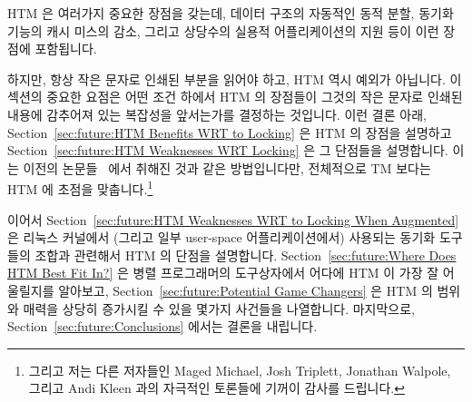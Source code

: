 HTM 은 여러가지 중요한 장점을 갖는데, 데이터 구조의 자동적인 동적 분할, 동기화
기능의 캐시 미스의 감소, 그리고 상당수의 실용적 어플리케이션의 지원 등이 이런
장점에 포함됩니다.

하지만, 항상 작은 문자로 인쇄된 부분을 읽어야 하고, HTM 역시 예외가 아닙니다.
이 섹션의 중요한 요점은 어떤 조건 하에서 HTM 의 장점들이 그것의 작은 문자로
인쇄된 내용에 감추어져 있는 복잡성을 앞서는가를 결정하는 것입니다.
이런 결론 아래,
Section~\ref{sec:future:HTM Benefits WRT to Locking}
은 HTM 의 장점을 설명하고
Section~\ref{sec:future:HTM Weaknesses WRT Locking}
은 그 단점들을 설명합니다.
이는 이전의 논문들~\cite{McKenney2007PLOSTM,PaulEMcKenney2010OSRGrassGreener}
에서 취해진 것과 같은 방법입니다만, 전체적으로 TM 보다는 HTM 에 초점을
맞춥니다.\footnote{
	그리고 저는 다른 저자들인 Maged Michael, Josh Triplett, Jonathan
	Walpole, 그리고 Andi Kleen  과의 자극적인 토론들에 기꺼이 감사를
	드립니다.}
\iffalse

HTM has a number of important benefits, including automatic
dynamic partitioning of data structures, reducing synchronization-primitive
cache misses, and supporting a fair number of practical applications.

However, it always pays to read the fine print, and HTM is no exception.
A major point of this section is determining under what conditions HTM's
benefits outweigh the complications hidden in its fine print.
To this end, Section~\ref{sec:future:HTM Benefits WRT to Locking}
describes HTM's benefits and
Section~\ref{sec:future:HTM Weaknesses WRT Locking} describes its weaknesses.
This is the same approach used in earlier
papers~\cite{McKenney2007PLOSTM,PaulEMcKenney2010OSRGrassGreener},
but focused on HTM rather than TM as a whole.\footnote{
	And I gratefully acknowledge many stimulating
	discussions with the other authors, Maged Michael, Josh Triplett,
	and Jonathan Walpole, as well as with Andi Kleen.}
\fi

이어서
Section~\ref{sec:future:HTM Weaknesses WRT to Locking When Augmented}
은 리눅스 커널에서 (그리고 일부 user-space 어플리케이션에서) 사용되는 동기화
도구들의 조합과 관련해서 HTM 의 단점을 설명합니다.
Section~\ref{sec:future:Where Does HTM Best Fit In?}
은 병렬 프로그래머의 도구상자에서 어다에 HTM 이 가장 잘 어울릴지를 알아보고,
Section~\ref{sec:future:Potential Game Changers}
은 HTM 의 범위와 매력을 상당히 증가시킬 수 있을 몇가지 사건들을 나열합니다.
마지막으로,
Section~\ref{sec:future:Conclusions}
에서는 결론을 내립니다.
\iffalse

Section~\ref{sec:future:HTM Weaknesses WRT to Locking When Augmented} then describes
HTM's weaknesses with respect to the combination of synchronization
primitives used in the Linux kernel (and in some user-space applications).
Section~\ref{sec:future:Where Does HTM Best Fit In?} looks at where HTM
might best fit into the parallel programmer's toolbox, and
Section~\ref{sec:future:Potential Game Changers} lists some events that might
greatly increase HTM's scope and appeal.
Finally, Section~\ref{sec:future:Conclusions}
presents concluding remarks.
\fi

